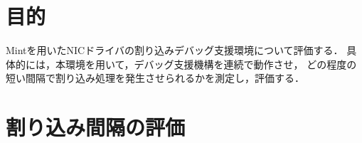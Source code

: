 \documentclass[tanilab-enum]{graduate}
\begin{document}
\section{目的}
Mintを用いたNICドライバの割り込みデバッグ支援環境について評価する．
具体的には，本環境を用いて，デバッグ支援機構を連続で動作させ，
どの程度の短い間隔で割り込み処理を発生させられるかを測定し，評価する．
\section{割り込み間隔の評価}
\end{document}
